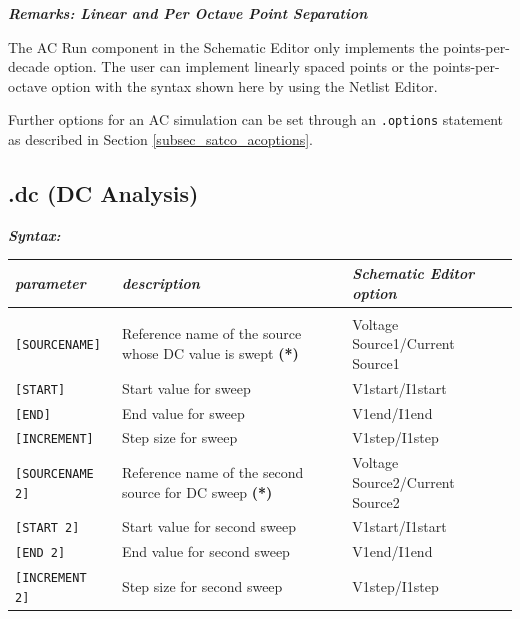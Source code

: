 \textbf{\textit{Remarks: Linear and Per Octave Point Separation}}

The AC Run component in the Schematic Editor only implements the points-per-decade option.  The user can implement linearly spaced points or the points-per-octave option with the syntax shown here by using the Netlist Editor.

Further options for an AC simulation can be set through an \texttt{.options} statement as described in Section \ref{subsec_satco_acoptions}.
\newpage

\subsection{.dc (DC Analysis)}
\label{subsec_satco_dc}

\textbf{\textit{Syntax:}}


\begin{tabular}{lp{5.5cm}p{5cm}}
\textit{parameter} & \textit{description} & \textit{Schematic Editor option}\\ \hline \\ \vspace{-0.8\parskip}
\texttt{[SOURCENAME]} & Reference name of the source whose DC value is swept \textbf{(*)} & \textsf{Voltage Source1/\newline Current Source1}\\
\texttt{[START]} & Start value for sweep & \textsf{V1start/I1start} \\
\texttt{[END]} & End value for sweep & \textsf{V1end/I1end} \\
\texttt{[INCREMENT]} & Step size for sweep & \textsf{V1step/I1step} \\
\texttt{[SOURCENAME 2]} & Reference name of the {second source for DC sweep \textbf{(*)}} & \textsf{Voltage Source2/\newline Current Source2}\\
\texttt{[START 2]} & Start value for second sweep & \textsf{V1start/I1start} \\
\texttt{[END 2]} & End value for second sweep & \textsf{V1end/I1end} \\
\texttt{[INCREMENT 2]} & Step size for second sweep & \textsf{V1step/I1step} \\
\end{tabular}

